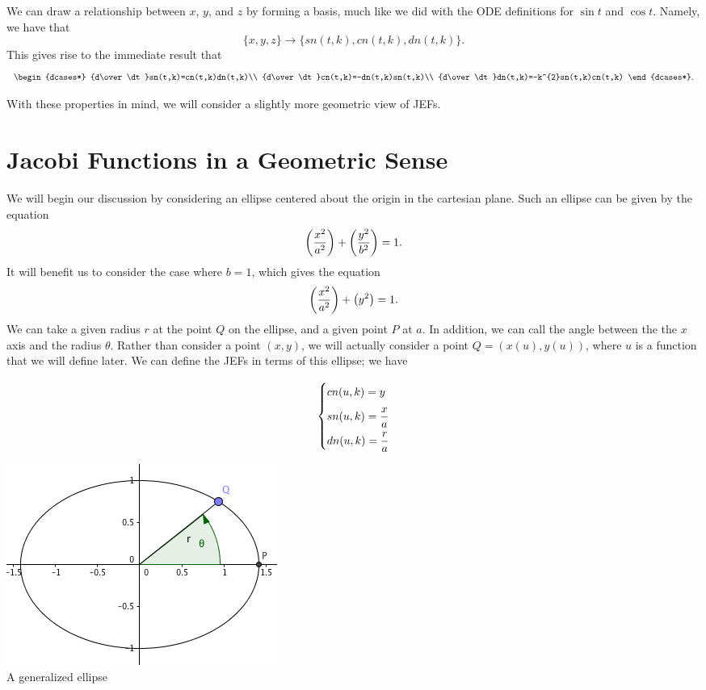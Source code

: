 \documentclass[notitlepage]{hw}
\begin{document}
We can draw a relationship between $x$, $y$, and $z$ by forming a basis, much like we did with the
ODE definitions for $\sin{t}$ and $\cos{t}$. Namely, we have that
\[
\{ x,y,z \}\to\{ sn(t,k),cn(t,k),dn(t,k) \}.
\]
This gives rise to the immediate result that
\[
\begin{dcases*}
{d\over\dt}sn(t,k)=cn(t,k)dn(t,k)\\
{d\over\dt}cn(t,k)=-dn(t,k)sn(t,k)\\
{d\over\dt}dn(t,k)=-k^{2}sn(t,k)cn(t,k)
\end{dcases*}.
\]

With these properties in mind, we will consider a slightly more geometric view of JEFs.

\section{Jacobi Functions in a Geometric Sense}

We will begin our discussion by considering an ellipse centered about the origin in the cartesian plane.
Such an ellipse can be given by the equation
\[
\left({x^{2}\over a^{2}}\right) + \left({y^{2}\over b^{2}}\right) = 1.
\]
It will benefit us to consider the case where $b=1$, which gives the equation
\[
\left({x^{2}\over a^{2}}\right) + \left(y^{2}\right) = 1.
\]
We can take a given radius $r$ at the point $Q$ on the ellipse, and a given point $P$ at $a$. In
addition, we can call the angle between the the $x$ axis and the radius $\theta$. Rather than consider
a point $(x,y)$, we will actually consider a point $Q=(x(u),y(u))$, where $u$ is a function that we will
define later. We can define the JEFs in terms of this ellipse; we have

\vspace{0.5cm}

\begin{minipage}{0.5\textwidth}
\[
\begin{dcases*}
cn(u,k)=y\vphantom{\frac{0}{0}}\\
sn(u,k)={x\over a}\\
dn(u,k)={r\over a}
\end{dcases*}
\]
\end{minipage}
\begin{minipage}{0.5\textwidth}
\begin{center}
\includegraphics[scale=0.5]{ellipsis}\\

A generalized ellipse
\end{center}
\end{minipage}
\end{document}
